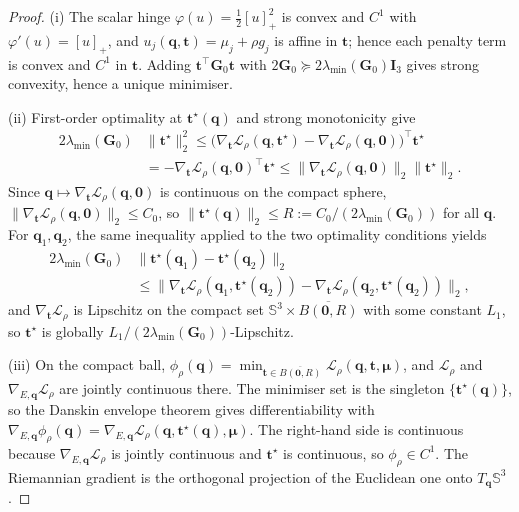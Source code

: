 \begin{proof}
(i) The scalar hinge $\varphi(u)=\tfrac12[u]_+^2$ is convex and $C^1$ with $\varphi'(u)=[u]_+$, and $u_j(\mathbf q,\mathbf t)=\mu_j+\rho g_j$ is affine in $\mathbf t$; hence each penalty term is convex and $C^1$ in $\mathbf t$. Adding $\mathbf t^\top\mathbf G_0\mathbf t$ with $2\mathbf G_0\succeq2\lambda_{\min}(\mathbf G_0)\mathbf I_3$ gives strong convexity, hence a unique minimiser.

(ii) First-order optimality at $\mathbf t^\star(\mathbf q)$ and strong monotonicity give
\begin{equation}
\begin{aligned}
2\lambda_{\min}(\mathbf G_0)&\|\mathbf t^\star\|_2^2
\le\big(\nabla_{\mathbf t}\mathcal L_\rho(\mathbf q,\mathbf t^\star)-\nabla_{\mathbf t}\mathcal L_\rho(\mathbf q,\mathbf 0)\big)^\top\mathbf t^\star\\
&=-\nabla_{\mathbf t}\mathcal L_\rho(\mathbf q,\mathbf 0)^\top\mathbf t^\star
\le\|\nabla_{\mathbf t}\mathcal L_\rho(\mathbf q,\mathbf 0)\|_2\|\mathbf t^\star\|_2 .
\end{aligned}
\end{equation}
Since $\mathbf q\mapsto\nabla_{\mathbf t}\mathcal L_\rho(\mathbf q,\mathbf 0)$ is continuous on the compact sphere, $\|\nabla_{\mathbf t}\mathcal L_\rho(\mathbf q,\mathbf 0)\|_2\le C_0$, so $\|\mathbf t^\star(\mathbf q)\|_2\le R:=C_0/(2\lambda_{\min}(\mathbf G_0))$ for all $\mathbf q$. For $\mathbf q_1,\mathbf q_2$, the same inequality applied to the two optimality conditions yields
\begin{equation}
\begin{aligned}
2\lambda_{\min}(\mathbf G_0)&\|\mathbf t^\star(\mathbf q_1)-\mathbf t^\star(\mathbf q_2)\|_2\\
&\le\|\nabla_{\mathbf t}\mathcal L_\rho(\mathbf q_1,\mathbf t^\star(\mathbf q_2))
-\nabla_{\mathbf t}\mathcal L_\rho(\mathbf q_2,\mathbf t^\star(\mathbf q_2))\|_2 ,
\end{aligned}
\end{equation}
and $\nabla_{\mathbf t}\mathcal L_\rho$ is Lipschitz on the compact set $\mathbb S^3\times\overline{B(\mathbf 0,R)}$ with some constant $L_1$, so $\mathbf t^\star$ is globally $L_1/(2\lambda_{\min}(\mathbf G_0))$-Lipschitz.

(iii) On the compact ball, $\phi_\rho(\mathbf q)=\min_{\mathbf t\in\overline{B(\mathbf 0,R)}}\mathcal L_\rho(\mathbf q,\mathbf t,\boldsymbol\mu)$, and $\mathcal L_\rho$ and $\nabla_{E,\mathbf q}\mathcal L_\rho$ are jointly continuous there. The minimiser set is the singleton $\{\mathbf t^\star(\mathbf q)\}$, so the Danskin envelope theorem gives differentiability with $\nabla_{E,\mathbf q}\phi_\rho(\mathbf q)=\nabla_{E,\mathbf q}\mathcal L_\rho(\mathbf q,\mathbf t^\star(\mathbf q),\boldsymbol\mu)$. The right-hand side is continuous because $\nabla_{E,\mathbf q}\mathcal L_\rho$ is jointly continuous and $\mathbf t^\star$ is continuous, so $\phi_\rho\in C^1$. The Riemannian gradient is the orthogonal projection of the Euclidean one onto $T_{\mathbf q}\mathbb S^3$.


\end{proof}
